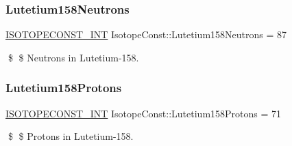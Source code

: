 \subsubsection{\texorpdfstring{Lutetium158\+Neutrons}{Lutetium158Neutrons}}
{\footnotesize\ttfamily \mbox{\hyperlink{group___isotope_const-_macros_ga5f18360b3e99483a35c32d789e62621c}{I\+S\+O\+T\+O\+P\+E\+C\+O\+N\+S\+T\+\_\+\+I\+NT}} Isotope\+Const\+::\+Lutetium158\+Neutrons = 87}

\$ \$ Neutrons in Lutetium-\/158. \mbox{\label{group___isotope_const-_lutetium-_lu158_ga47e8782450c405183d91f90633cace54}} 
\subsubsection{\texorpdfstring{Lutetium158\+Protons}{Lutetium158Protons}}
{\footnotesize\ttfamily \mbox{\hyperlink{group___isotope_const-_macros_ga5f18360b3e99483a35c32d789e62621c}{I\+S\+O\+T\+O\+P\+E\+C\+O\+N\+S\+T\+\_\+\+I\+NT}} Isotope\+Const\+::\+Lutetium158\+Protons = 71}

\$ \$ Protons in Lutetium-\/158. 